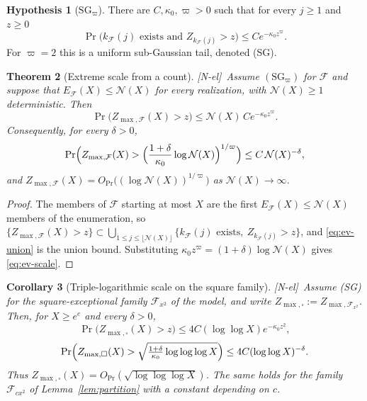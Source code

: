 \documentclass[11pt,reqno]{amsart}
\numberwithin{equation}{section}
\theoremstyle{plain}
\newtheorem{theorem}{Theorem}[section]
\newtheorem{corollary}[theorem]{Corollary}
\theoremstyle{definition}
\newtheorem{hypothesis}[theorem]{Hypothesis}
\theoremstyle{remark}
\newcommand{\F}{\mathcal{F}}
\newcommand{\tagNE}{\textup{[N-el]}}
\begin{document}
\begin{hypothesis}[$\mathrm{SG}_\varpi$]
\label{hyp:SG}
There are $C,\kappa_0,\varpi>0$ such that for every $j\ge1$ and $z\ge0$
\begin{equation}
\Pr\bigl(k_\F(j)\text{ exists and }Z_{k_\F(j)}>z\bigr)\le Ce^{-\kappa_0z^\varpi}.
\end{equation}
For $\varpi=2$ this is a uniform sub-Gaussian tail, denoted (SG).
\end{hypothesis}

\begin{theorem}[Extreme scale from a count]
\label{thm:ev-union}
\tagNE\ Assume $(\mathrm{SG}_\varpi)$ for $\F$ and suppose that $E_\F(X)\le \mathcal N(X)$ for
every realization, with $\mathcal N(X)\ge1$ deterministic. Then
\begin{equation}
\label{eq:ev-union}
\Pr\bigl(Z_{\max,\F}(X)>z\bigr)\le \mathcal N(X)\,Ce^{-\kappa_0z^\varpi}.
\end{equation}
Consequently, for every $\delta>0$,
\begin{equation}
\label{eq:ev-scale}
\Pr\Bigl(Z_{\max,\F}(X)>\Bigl(\frac{1+\delta}{\kappa_0}\log \mathcal N(X)\Bigr)^{1/\varpi}\Bigr)
\le C\,\mathcal N(X)^{-\delta},
\end{equation}
and $Z_{\max,\F}(X)=O_{\Pr}\bigl((\log \mathcal N(X))^{1/\varpi}\bigr)$ as $\mathcal N(X)\to\infty$.
\end{theorem}

\begin{proof}
The members of $\F$ starting at most $X$ are the first $E_\F(X)\le \mathcal N(X)$
members of the enumeration, so
$\{Z_{\max,\F}(X)>z\}\subset\bigcup_{1\le j\le\lfloor\mathcal N(X)\rfloor}\{k_\F(j)\text{ exists},\
Z_{k_\F(j)}>z\}$, and \eqref{eq:ev-union} is the union bound. Substituting
$\kappa_0z^\varpi=(1+\delta)\log \mathcal N(X)$ gives \eqref{eq:ev-scale}.
\end{proof}

\begin{corollary}[Triple-logarithmic scale on the square family]
\label{cor:ev-square}
\tagNE\ Assume (SG) for the square-exceptional family $\F_{x^2}$ of the model, and
write $Z_{\max,\square}:=Z_{\max,\F_{x^2}}$. Then, for $X\ge e^e$ and every
$\delta>0$,
\begin{equation}
\label{eq:ev-square}
\Pr\bigl(Z_{\max,\square}(X)>z\bigr)\le4C(\log\log X)e^{-\kappa_0z^2},
\end{equation}
\begin{equation}
\label{eq:ev-square-b}
\Pr\Bigl(Z_{\max,\square}(X)>\sqrt{\tfrac{1+\delta}{\kappa_0}\log\log\log X}\Bigr)
\le4C(\log\log X)^{-\delta}.
\end{equation}
Thus $Z_{\max,\square}(X)=O_{\Pr}(\sqrt{\log\log\log X})$. The same holds for
the family $\F_{cx^2}$ of Lemma~\ref{lem:partition} with a constant depending
on $c$.
\end{corollary}
\end{document}
